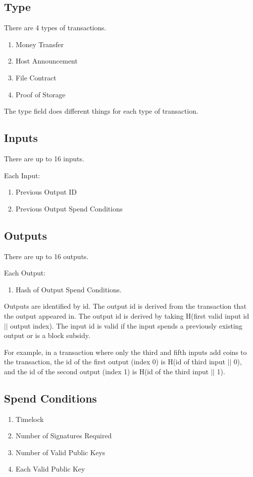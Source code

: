 \documentclass[twocolumn]{article}
\begin{document}
\subsection{Type}
There are 4 types of transactions.
\begin{enumerate}
	\item Money Transfer
	\item Host Announcement
	\item File Contract
	\item Proof of Storage
\end{enumerate}

The type field does different things for each type of transaction.

\subsection{Inputs}
There are up to 16 inputs.

Each Input:
\begin{enumerate}
	\item Previous Output ID
	\item Previous Output Spend Conditions
\end{enumerate}

\subsection{Outputs}
There are up to 16 outputs.

Each Output:
\begin{enumerate}
	\item Hash of Output Spend Conditions.
\end{enumerate}

Outputs are identified by id.
The output id is derived from the transaction that the output appeared in.
The output id is derived by taking H(first valid input id $||$ output index).
The input id is valid if the input spends a previously existing output or is a block subsidy.

For example, in a transaction where only the third and fifth inputs add coins to the transaction, the id of the first output (index 0) is H(id of third input $||$ 0), and the id of the second output (index 1) is H(id of the third input $||$ 1).

\subsection{Spend Conditions}
\begin{enumerate}
	\item Timelock
	\item Number of Signatures Required
	\item Number of Valid Public Keys
	\item Each Valid Public Key
\end{enumerate}
\end{document}
